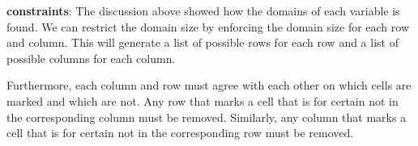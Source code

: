 \noindent
\textbf{constraints}: The discussion above showed how the domains of each
variable is found. We can restrict the domain size by enforcing the domain
size for each row and column.  This will generate a list of possible rows for
each row and a list of possible columns for each column.

Furthermore, each column and row must agree with each other on which cells are marked
and which are not. Any row that marks a cell that is for certain not in the
corresponding column must be removed. Similarly, any column that marks a cell
that is for certain not in the corresponding row must be removed.\\

% 
% 
% 
% 
% 
% 
% 
% 
% 
% 
